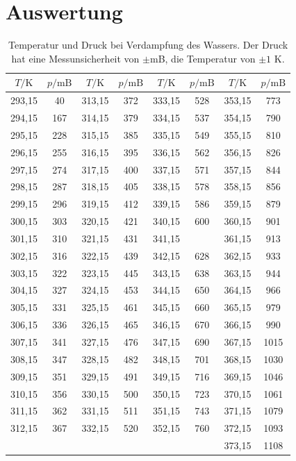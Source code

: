 \newpage
\section{Auswertung}
\label{sec:Auswertung}

\begin{table}
  \centering
  \caption{Temperatur und Druck bei Verdampfung des Wassers. Der Druck hat eine Messunsicherheit von
  $\pm$mB, die Temperatur von $\pm 1$ K.}
  \label{tab:Messreihe_1}
\begin{tabular}{
  c c||c c||c c||c c
}
\toprule 
$T/ \unit{\kelvin}$ & $p / \text{mB}$ & $T/ \unit{\kelvin}$ & $p / \text{mB}$&
$T/ \unit{\kelvin}$ & $p / \text{mB}$ & $T/ \unit{\kelvin}$ & $p / \text{mB}$ \\
\midrule
293,15  & 40   & 313,15  & 372  & 333,15  & 528  & 353,15  & 773 \\
294,15  & 167  & 314,15  & 379  & 334,15  & 537  & 354,15  & 790 \\
295,15  & 228  & 315,15  & 385  & 335,15  & 549  & 355,15  & 810 \\
296,15  & 255  & 316,15  & 395  & 336,15  & 562  & 356,15  & 826 \\
297,15  & 274  & 317,15  & 400  & 337,15  & 571  & 357,15  & 844 \\
298,15  & 287  & 318,15  & 405  & 338,15  & 578  & 358,15  & 856 \\
299,15  & 296  & 319,15  & 412  & 339,15  & 586  & 359,15  & 879 \\
300,15  & 303  & 320,15  & 421  & 340,15  & 600  & 360,15  & 901 \\
301,15  & 310  & 321,15  & 431  & 341,15  & \text{--}  & 361,15  & 913 \\
302,15  & 316  & 322,15  & 439  & 342,15  & 628  & 362,15  & 933 \\
303,15  & 322  & 323,15  & 445  & 343,15  & 638  & 363,15  & 944 \\
304,15  & 327  & 324,15  & 453  & 344,15  & 650  & 364,15  & 966 \\
305,15  & 331  & 325,15  & 461  & 345,15  & 660  & 365,15  & 979 \\
306,15  & 336  & 326,15  & 465  & 346,15  & 670  & 366,15  & 990 \\
307,15  & 341  & 327,15  & 476  & 347,15  & 690  & 367,15  & 1015\\
308,15  & 347  & 328,15  & 482  & 348,15  & 701  & 368,15  & 1030\\
309,15  & 351  & 329,15  & 491  & 349,15  & 716  & 369,15  & 1046\\
310,15  & 356  & 330,15  & 500  & 350,15  & 723  & 370,15  & 1061\\
311,15  & 362  & 331,15  & 511  & 351,15  & 743  & 371,15  & 1079\\
312,15  & 367  & 332,15  & 520  & 352,15  & 760  & 372,15  & 1093\\
      &   &       &       &       &      & 373,15  & 1108 \\
\bottomrule
\end{tabular}
\end{table}
